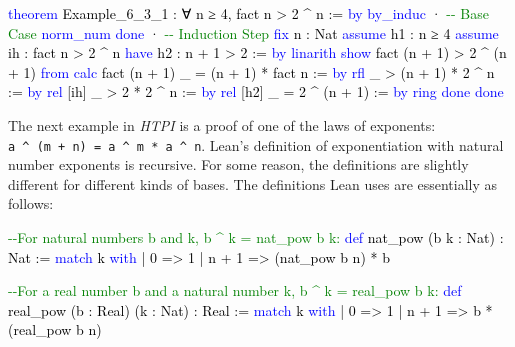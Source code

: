 \documentclass[
  letterpaper,
  DIV=11,
  numbers=noendperiod]{scrreprt}
\newenvironment{Shaded}{\begin{snugshade}}{\end{snugshade}}
\newcommand{\CommentTok}[1]{\textcolor[rgb]{0.37,0.37,0.37}{#1}}
\newcommand{\KeywordTok}[1]{\textcolor[rgb]{0.00,0.23,0.31}{#1}}
\newcommand{\NormalTok}[1]{\textcolor[rgb]{0.00,0.23,0.31}{#1}}
\renewcommand{\NormalTok}[1]{\textcolor[HTML]{000000}{#1}}
\renewcommand{\KeywordTok}[1]{\textcolor[HTML]{0000FF}{#1}}
\renewcommand{\CommentTok}[1]{\textcolor[HTML]{008000}{#1}}
\theoremstyle{remark}
\begin{document}
\begin{Shaded}
\begin{Highlighting}[]
\KeywordTok{theorem}\NormalTok{ Example\_6\_3\_1 : ∀ n ≥ 4, fact n \textgreater{} 2 \^{} n := }\KeywordTok{by}
  \KeywordTok{by\_induc}
\NormalTok{  · }\CommentTok{{-}{-} Base Case}
    \KeywordTok{norm\_num}
    \KeywordTok{done}
\NormalTok{  · }\CommentTok{{-}{-} Induction Step}
    \KeywordTok{fix}\NormalTok{ n : Nat}
    \KeywordTok{assume}\NormalTok{ h1 : n ≥ 4}
    \KeywordTok{assume}\NormalTok{ ih : fact n \textgreater{} 2 \^{} n}
    \KeywordTok{have}\NormalTok{ h2 : n + 1 \textgreater{} 2 := }\KeywordTok{by} \KeywordTok{linarith}
    \KeywordTok{show}\NormalTok{ fact (n + 1) \textgreater{} 2 \^{} (n + 1) }\KeywordTok{from}
      \KeywordTok{calc}\NormalTok{ fact (n + 1)}
\NormalTok{        \_ = (n + 1) * fact n := }\KeywordTok{by} \KeywordTok{rfl}
\NormalTok{        \_ \textgreater{} (n + 1) * 2 \^{} n := }\KeywordTok{by} \KeywordTok{rel}\NormalTok{ [ih]}
\NormalTok{        \_ \textgreater{} 2 * 2 \^{} n := }\KeywordTok{by} \KeywordTok{rel}\NormalTok{ [h2]}
\NormalTok{        \_ = 2 \^{} (n + 1) := }\KeywordTok{by} \KeywordTok{ring}
    \KeywordTok{done}
  \KeywordTok{done}
\end{Highlighting}
\end{Shaded}

The next example in \emph{HTPI} is a proof of one of the laws of
exponents: \texttt{a\ \^{}\ (m\ +\ n)\ =\ a\ \^{}\ m\ *\ a\ \^{}\ n}.
Lean's definition of exponentiation with natural number exponents is
recursive. For some reason, the definitions are slightly different for
different kinds of bases. The definitions Lean uses are essentially as
follows:

\begin{Shaded}
\begin{Highlighting}[]
\CommentTok{{-}{-}For natural numbers b and k, b \^{} k = nat\_pow b k:}
\KeywordTok{def}\NormalTok{ nat\_pow (b k : Nat) : Nat :=}
  \KeywordTok{match}\NormalTok{ k }\KeywordTok{with}
\NormalTok{    | 0 =\textgreater{} 1}
\NormalTok{    | n + 1 =\textgreater{} (nat\_pow b n) * b}

\CommentTok{{-}{-}For a real number b and a natural number k, b \^{} k = real\_pow b k:}
\KeywordTok{def}\NormalTok{ real\_pow (b : Real) (k : Nat) : Real :=}
  \KeywordTok{match}\NormalTok{ k }\KeywordTok{with}
\NormalTok{    | 0 =\textgreater{} 1}
\NormalTok{    | n + 1 =\textgreater{} b * (real\_pow b n)}
\end{Highlighting}
\end{Shaded}
\end{document}
